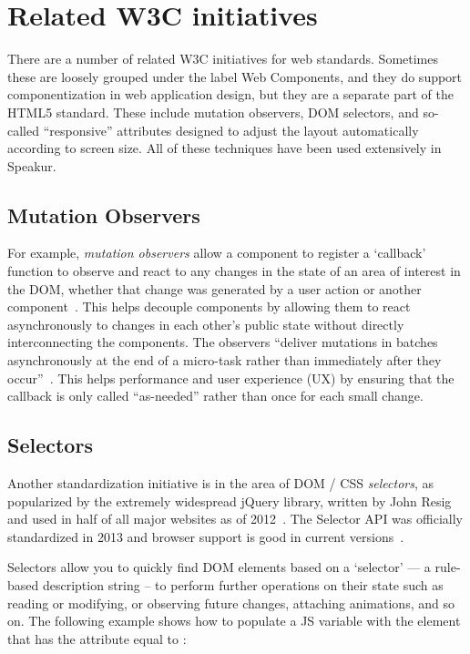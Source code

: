 \section{Related W3C initiatives}
There are a number of related W3C initiatives for web standards. 
Sometimes these are loosely grouped under the label Web Components,
and they do support componentization in web application design, 
but they are a separate part of the HTML5 standard.
These include mutation observers, DOM selectors, and so-called ``responsive'' attributes designed to adjust the layout automatically according to screen size.
All of these techniques have been used extensively in Speakur.

\subsection{Mutation Observers}
For example, \textit{mutation observers}
allow a component to register a `callback' function to observe and react to any changes in the state of an area of interest in the DOM, 
whether that change was generated by a user action or another 
component~\cite{w3ccontributors2014}.
This helps decouple components by allowing them to react asynchronously to changes in each other's public state without directly interconnecting the components.
The observers ``deliver mutations in batches asynchronously at the end of a micro-task rather than immediately after they occur''~\cite{addyosmani2014}.
This helps performance and user experience (UX) by ensuring that the callback is only called ``as-needed'' rather than once for each small change.

\subsection{Selectors}
Another standardization initiative is in the area of DOM / CSS \textit{selectors},
as popularized by the extremely widespread jQuery library,
written by John Resig 
and used in half of all major websites as of 2012~\cite{matthiasgelbmann2012}.
The Selector API was officially standardized in 2013 and browser support is good in current versions~\cite{w3ccontributors2013}.

Selectors allow you to quickly find DOM elements based on a `selector' --- a rule-based description string -- to perform further operations on their state such as reading or modifying, or observing future changes, attaching animations, and so on. 
The following example shows how to populate a JS variable with the element that has the  attribute equal to :

